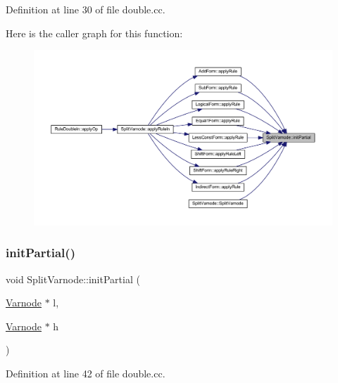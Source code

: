 Definition at line 30 of file double.\+cc.

Here is the caller graph for this function\+:
\nopagebreak
\begin{figure}[H]
\begin{center}
\leavevmode
\includegraphics[width=350pt]{class_split_varnode_a858758ae5cd0507de5f06fc966e10156_icgraph}
\end{center}
\end{figure}
\mbox{\label{class_split_varnode_a72c28276a2cb5c479131f80367917f4c}} 
\subsubsection{\texorpdfstring{initPartial()}{initPartial()}\hspace{0.1cm}{\footnotesize\ttfamily [2/2]}}
{\footnotesize\ttfamily void Split\+Varnode\+::init\+Partial (\begin{DoxyParamCaption}\item[{\mbox{\hyperlink{class_varnode}{Varnode}} $\ast$}]{l,  }\item[{\mbox{\hyperlink{class_varnode}{Varnode}} $\ast$}]{h }\end{DoxyParamCaption})}



Definition at line 42 of file double.\+cc.

\mbox{\label{class_split_varnode_ac857d72933606a431013da7fb0883ddf}} 
